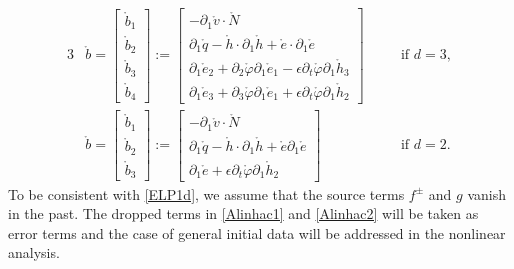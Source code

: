 \documentclass[twoside,11pt]{article}
\numberwithin{equation}{section}
\def\p{\partial}
\begin{document}
	\begin{alignat}{3} \label{b.ring3D:def}
&		\mathring{b}=
		\begin{bmatrix}
			\mathring{b}_1\\[0.5mm]
			\mathring{b}_2\\[0.5mm]
			\mathring{b}_3\\[0.5mm]
			\mathring{b}_4	
		\end{bmatrix}
		:=	\begin{bmatrix}
			-\p_1 \mathring{v}\cdot \mathring{N}\\[0.5mm]
			\p_1\mathring{q}-\mathring{{h}}\cdot \p_1\mathring{{h}}+
			\mathring{e}\cdot \p_1\mathring{e}\\[0.5mm]
			\p_1 \mathring{e}_2+\p_2\mathring{\varphi}\p_1 \mathring{e}_1-\epsilon \p_t\mathring{\varphi} \p_1 \mathring{h}_3	 \\[0.5mm]
			\p_1 \mathring{e}_3+\p_3\mathring{\varphi}\p_1 \mathring{e}_1+\epsilon \p_t\mathring{\varphi} \p_1 \mathring{h}_2
		\end{bmatrix}\quad &&\textrm{if }d=3,\\[1mm]
&		\mathring{b}=
\begin{bmatrix}
	\mathring{b}_1\\[0.5mm]
	\mathring{b}_2\\[0.5mm]
	\mathring{b}_3
\end{bmatrix}
:=	\begin{bmatrix}
	-\p_1 \mathring{v}\cdot \mathring{N}\\[0.5mm]
	\p_1\mathring{q}-\mathring{{h}}\cdot \p_1\mathring{{h}}+
	\mathring{e}  \p_1\mathring{e}\\[0.5mm]
	\p_1 \mathring{e}+\epsilon \p_t\mathring{\varphi} \p_1 \mathring{h}_2
\end{bmatrix}\quad &&\textrm{if }d=2.		
\label{b.ring2D:def}
	\end{alignat}
	To be consistent with \eqref{ELP1d}, we assume that the source terms $f^{\pm}$ and $g$ vanish in the past.
The dropped terms in \eqref{Alinhac1} and \eqref{Alinhac2} will be taken as error terms and the case of general initial data will be addressed in the nonlinear analysis.	
\end{document}
